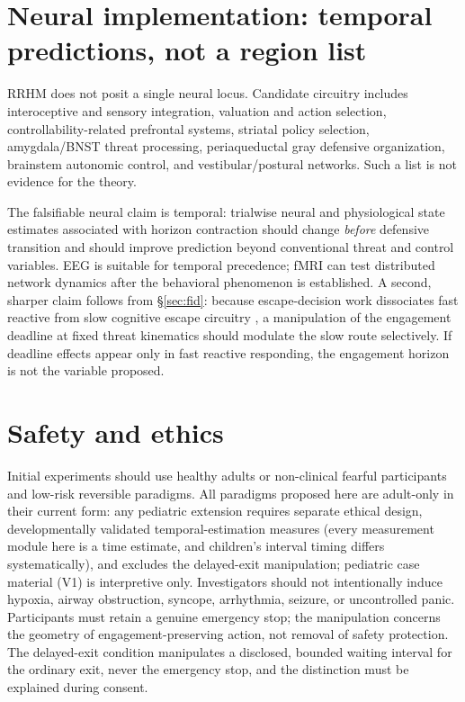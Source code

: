 \documentclass[9pt,twocolumn]{article}
\begin{document}
\section{Neural implementation: temporal predictions, not a region list}
RRHM does not posit a single neural locus. Candidate circuitry includes interoceptive and sensory integration, valuation and action selection, controllability-related prefrontal systems, striatal policy selection, amygdala/BNST threat processing, periaqueductal gray defensive organization, brainstem autonomic control, and vestibular/postural networks. Such a list is not evidence for the theory.

The falsifiable neural claim is temporal: trialwise neural and physiological state estimates associated with horizon contraction should change \emph{before} defensive transition and should improve prediction beyond conventional threat and control variables. EEG is suitable for temporal precedence; fMRI can test distributed network dynamics after the behavioral phenomenon is established. A second, sharper claim follows from \S\ref{sec:fid}: because escape-decision work dissociates fast reactive from slow cognitive escape circuitry \cite{qi2018,fung2019}, a manipulation of the engagement deadline at fixed threat kinematics should modulate the slow route selectively. If deadline effects appear only in fast reactive responding, the engagement horizon is not the variable proposed.

\section{Safety and ethics}
\label{sec:safety}
Initial experiments should use healthy adults or non-clinical fearful participants and low-risk reversible paradigms. All paradigms proposed here are adult-only in their current form: any pediatric extension requires separate ethical design, developmentally validated temporal-estimation measures (every measurement module here is a time estimate, and children's interval timing differs systematically), and excludes the delayed-exit manipulation; pediatric case material (V1) is interpretive only. Investigators should not intentionally induce hypoxia, airway obstruction, syncope, arrhythmia, seizure, or uncontrolled panic. Participants must retain a genuine emergency stop; the manipulation concerns the geometry of engagement-preserving action, not removal of safety protection. The delayed-exit condition manipulates a disclosed, bounded waiting interval for the ordinary exit, never the emergency stop, and the distinction must be explained during consent.
\end{document}
